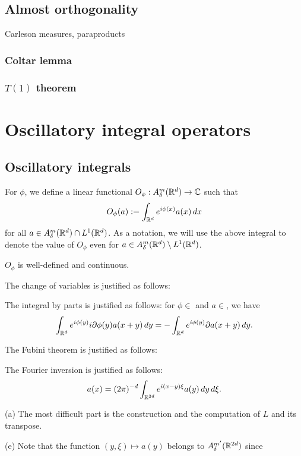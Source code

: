 \documentclass{../../large}
\begin{document}
\chapter{Almost orthogonality}
Carleson measures, paraproducts
\section{Coltar lemma}
\section{$T(1)$ theorem}




\part{Oscillatory integral operators}


\chapter{Oscillatory integrals}


\begin{prb}
For $\phi$, we define a linear functional $O_\phi:A_\delta^m(\mathbb{R}^d)\to\mathbb{C}$ such that
\[O_\phi(a):=\int_{\mathbb{R}^d}e^{i\phi(x)}a(x)\,dx\]
for all $a\in A_\delta^m(\mathbb{R}^d)\cap L^1(\mathbb{R}^d)$.
As a notation, we will use the above integral to denote the value of $O_\phi$ even for $a\in A_\delta^m(\mathbb{R}^d)\setminus L^1(\mathbb{R}^d)$.
\begin{parts}
\item $O_\phi$ is well-defined and continuous.
\item The change of variables is justified as follows:
\item The integral by parts is justified as follows: for $\phi\in$ and $a\in$, we have
\[\int_{\mathbb{R}^d}e^{i\phi(y)}i\partial\phi(y)a(x+y)\,dy=-\int_{\mathbb{R}^d}e^{i\phi(y)}\partial a(x+y)\,dy.\]
\item The Fubini theorem is justified as follows:
\item The Fourier inversion is justified as follows:
\[a(x)=(2\pi)^{-d}\int_{\mathbb{R}^{2d}}e^{i(x-y)\xi}a(y)\,dy\,d\xi.\]
\end{parts}
\end{prb}
\begin{pf}
(a)
The most difficult part is the construction and the computation of $L$ and its transpose.

(e)
Note that the function $(y,\xi)\mapsto a(y)$ belongs to $A_\delta^{m'}(\mathbb{R}^{2d})$ since
\end{pf}
\end{document}
